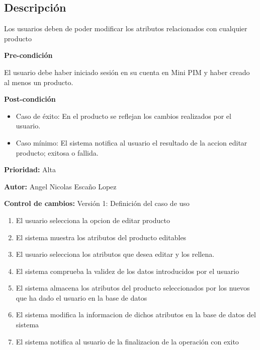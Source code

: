 {}

\subsection*{Descripción}
Los usuarios deben de poder modificar los atributos relacionados con cualquier producto\par
\vspace{0.15cm}

\textbf{Pre-condición}\par
El usuario debe haber iniciado sesión en su cuenta en Mini PIM y haber creado al menos un producto.\par
\vspace{0.15cm}

\textbf{Post-condición}
\begin{itemize}
    \item Caso de éxito: En el producto se reflejan los cambios realizados por el usuario.
    \item Caso mínimo: El sistema notifica al usuario el resultado de la accion editar producto; exitosa o fallida.
\end{itemize}

\textbf{Prioridad: }
Alta
\vspace{0.15cm}

\textbf{Autor: }
Angel Nicolas Escaño Lopez\par
\vspace{0.15cm}

\textbf{Control de cambios: } Versión 1: Definición del caso de uso

\begin{enumerate}
    \item El usuario selecciona la opcion de editar producto
    \item El sistema muestra los atributos del producto editables
    \item El usuario selecciona los atributos que desea editar y los rellena.
    \item El sistema comprueba la validez de los datos introducidos por el usuario
    \item El sistema almacena los atributos del producto seleccionados por los nuevos que ha dado el usuario en la base de datos
    \item El sistema modifica la informacion de dichos atributos en la base de datos del sistema
    \item El sistema notifica al usuario de la finalizacion de la operación con exito
\end{enumerate}

